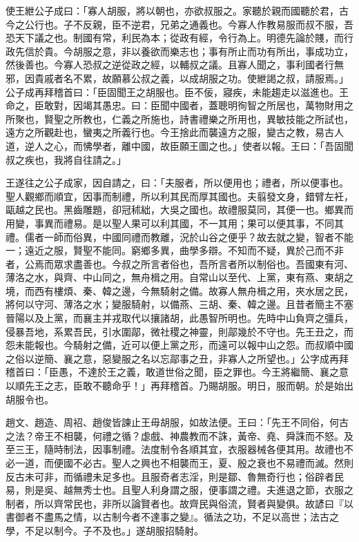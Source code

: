 \begin{pinyinscope}
使王紲公子成曰：「寡人胡服，將以朝也，亦欲叔服之。家聽於親而國聽於君，古今之公行也。子不反親，臣不逆君，兄弟之通義也。今寡人作教易服而叔不服，吾恐天下議之也。制國有常，利民為本；從政有經，令行為上。明德先論於賤，而行政先信於貴。今胡服之意，非以養欲而樂志也；事有所止而功有所出，事成功立，然後善也。今寡人恐叔之逆從政之經，以輔叔之議。且寡人聞之，事利國者行無邪，因貴戚者名不累，故願慕公叔之義，以成胡服之功。使紲謁之叔，請服焉。」公子成再拜稽首曰：「臣固聞王之胡服也。臣不佞，寢疾，未能趨走以滋進也。王命之，臣敢對，因竭其愚忠。曰：臣聞中國者，蓋聰明徇智之所居也，萬物財用之所聚也，賢聖之所教也，仁義之所施也，詩書禮樂之所用也，異敏技能之所試也，遠方之所觀赴也，蠻夷之所義行也。今王捨此而襲遠方之服，變古之教，易古人道，逆人之心，而怫學者，離中國，故臣願王圖之也。」使者以報。王曰：「吾固聞叔之疾也，我將自往請之。」

王遂往之公子成家，因自請之，曰：「夫服者，所以便用也；禮者，所以便事也。聖人觀鄉而順宜，因事而制禮，所以利其民而厚其國也。夫翦發文身，錯臂左衽，甌越之民也。黑齒雕題，卻冠秫絀，大吳之國也。故禮服莫同，其便一也。鄉異而用變，事異而禮易。是以聖人果可以利其國，不一其用；果可以便其事，不同其禮。儒者一師而俗異，中國同禮而教離，況於山谷之便乎？故去就之變，智者不能一；遠近之服，賢聖不能同。窮鄉多異，曲學多辯。不知而不疑，異於己而不非者，公焉而眾求盡善也。今叔之所言者俗也，吾所言者所以制俗也。吾國東有河、薄洛之水，與齊、中山同之，無舟楫之用。自常山以至代、上黨，東有燕、東胡之境，而西有樓煩、秦、韓之邊，今無騎射之備。故寡人無舟楫之用，夾水居之民，將何以守河、薄洛之水；變服騎射，以備燕、三胡、秦、韓之邊。且昔者簡主不塞晉陽以及上黨，而襄主并戎取代以攘諸胡，此愚智所明也。先時中山負齊之彊兵，侵暴吾地，系累吾民，引水圍鄗，微社稷之神靈，則鄗幾於不守也。先王丑之，而怨未能報也。今騎射之備，近可以便上黨之形，而遠可以報中山之怨。而叔順中國之俗以逆簡、襄之意，惡變服之名以忘鄗事之丑，非寡人之所望也。」公字成再拜稽首曰：「臣愚，不達於王之義，敢道世俗之聞，臣之罪也。今王將繼簡、襄之意以順先王之志，臣敢不聽命乎！」再拜稽首。乃賜胡服。明日，服而朝。於是始出胡服令也。

趙文、趙造、周袑、趙俊皆諫止王毋胡服，如故法便。王曰：「先王不同俗，何古之法？帝王不相襲，何禮之循？虙戲、神農教而不誅，黃帝、堯、舜誅而不怒。及至三王，隨時制法，因事制禮。法度制令各順其宜，衣服器械各便其用。故禮也不必一道，而便國不必古。聖人之興也不相襲而王，夏、殷之衰也不易禮而滅。然則反古未可非，而循禮未足多也。且服奇者志淫，則是鄒、魯無奇行也；俗辟者民易，則是吳、越無秀士也。且聖人利身謂之服，便事謂之禮。夫進退之節，衣服之制者，所以齊常民也，非所以論賢者也。故齊民與俗流，賢者與變俱。故諺曰『以書御者不盡馬之情，以古制今者不達事之變』。循法之功，不足以高世；法古之學，不足以制今。子不及也。」遂胡服招騎射。


\end{pinyinscope}
